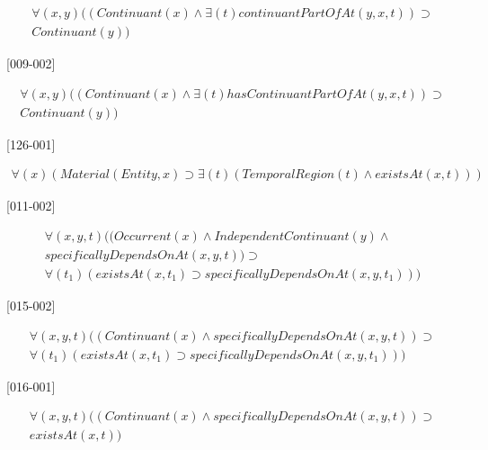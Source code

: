 \documentclass{article}
\begin{document}
\begin{flushright}
\begin{equation}
\begin{split}
{\forall}(x, y)((Continuant(x) \wedge {\exists}(t)continuantPartOfAt(y, x, t)) \supset \\
Continuant(y))
\end{split}
\end{equation}

[009-002] 

\begin{equation}
\begin{split}
{\forall}(x, y)((Continuant(x) \wedge {\exists}(t)hasContinuantPartOfAt(y, x, t)) \supset \\
Continuant(y))
\end{split}
\end{equation}

[126-001] 

\begin{equation}
\begin{split}
{\forall}(x)(Material(Entity, x) \supset {\exists}(t)(TemporalRegion(t) \wedge existsAt(x, t)))
\end{split}
\end{equation}

[011-002] 

\begin{equation}
\begin{split}
{\forall}(x, y, t)((Occurrent(x) \wedge IndependentContinuant(y) \wedge \\
specificallyDependsOnAt(x, y, t)) \supset \\
{\forall}(t_1)(existsAt(x, t_1) \supset specificallyDependsOnAt(x, y, t_1)))
\end{split}
\end{equation}

[015-002] 

\begin{equation}
\begin{split}
{\forall}(x, y, t)((Continuant(x) \wedge specificallyDependsOnAt(x, y, t)) \supset \\
{\forall}(t_1)(existsAt(x, t_1) \supset specificallyDependsOnAt(x, y, t_1)))
\end{split}
\end{equation}

[016-001] 

\begin{equation}
\begin{split}
{\forall}(x, y, t)((Continuant(x) \wedge specificallyDependsOnAt(x, y, t)) \supset \\
existsAt(x, t))
\end{split}
\end{equation}


\end{flushright}
\end{document}
